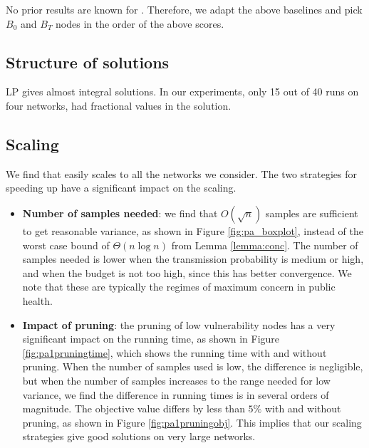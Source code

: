 No prior results are known for \probtwo{}. Therefore, we adapt the above baselines and pick $B_0$ and $B_T$
nodes in the order of the above scores.

\subsection{Structure of solutions}

LP gives almost integral solutions. In our experiments, only 15 out of 40 runs on four networks, had fractional values in the solution. 

\subsection{Scaling}

We find that \algo{} easily scales to all the networks we consider. The two strategies for speeding up have a
significant impact on the scaling.
\begin{itemize}
\item
\textbf{Number of samples needed}: we find that $O(\sqrt{n})$ samples are sufficient to get reasonable variance, as shown in Figure \ref{fig:pa_boxplot},
instead of the worst case bound of $\Theta(n\log{n})$ from Lemma \ref{lemma:conc}.
The number of samples needed is lower when the transmission probability is medium or high, and when the budget is not too high,
since this has better convergence. We note that these are typically the regimes of maximum concern in public health.
\item
\textbf{Impact of pruning}: the pruning of low vulnerability nodes has a very significant impact on the running time,
as shown in Figure \ref{fig:pa1pruningtime}, which shows the running time with and without pruning. 
When the number of samples used is low, the difference is negligible, but when the number of samples increases to
the range needed for low variance, we find the difference in running times is in several orders of magnitude.
The objective value differs by less than $5\%$ with and without pruning, as shown in Figure \ref{fig:pa1pruningobj}.
This implies that our scaling strategies give good solutions on very large networks.
\end{itemize}
 
